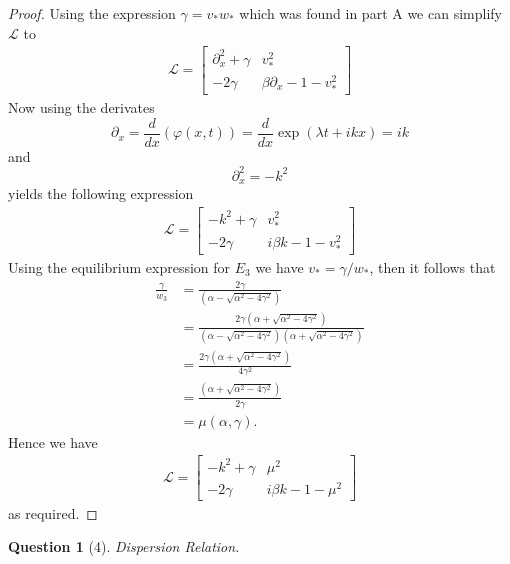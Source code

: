 \documentclass[11pt]{article}
\theoremstyle{quest}
\newtheorem*{question}{Question}
\newcommand{\Dp}{\partial}
\newcommand{\Bl}{\mathcal{L}}
\begin{document}
\begin{proof}
    Using the expression $\gamma = v_* w_*$ which was found in part A we can simplify $\Bl$
    to 
    \begin{align*}
        \Bl =
        \begin{bmatrix}
            \Dp_x^2 + \gamma & v_*^2\\
            - 2\gamma & \beta \Dp_x -1  -v_*^2
        \end{bmatrix}
    \end{align*}
    Now using the derivates $$\Dp_x = \frac{d}{dx}( \varphi(x,t) ) = \frac{d}{dx} \exp{ \left( \lambda t+ i k x  \right)  } = ik$$ 
    and $$ \Dp_x^2 = -k^2$$ 
    yields the following expression
    \begin{align*}
        \Bl =
        \begin{bmatrix}
            -k^2 + \gamma & v_*^2\\
            - 2\gamma & i\beta k  -1  -v_*^2
        \end{bmatrix}
    \end{align*}
    Using the equilibrium expression for $E_3$ we have $v_* = \gamma/ w_*$, then it follows that
    \begin{align*}
        \frac{\gamma}{w_3} &= \frac{ 2 \gamma }{(\alpha - \sqrt{ \alpha^2 - 4 \gamma^2 })} \\
                           &= \frac{2 \gamma (\alpha + \sqrt{ \alpha^2 - 4 \gamma^2 })}{(\alpha - \sqrt{ \alpha^2 - 4 \gamma^2 })(\alpha + \sqrt{ \alpha^2 - 4 \gamma^2 })} \\
                           &= \frac{ 2 \gamma (\alpha + \sqrt{ \alpha^2 - 4 \gamma^2 }) }{4\gamma^2} \\
                           &= \frac{(\alpha + \sqrt{ \alpha^2 - 4 \gamma^2 }) }{2 \gamma} \\ 
                           &= \mu(\alpha, \gamma).
    \end{align*}
    Hence we have
    \begin{align*}
        \Bl =
        \begin{bmatrix}
            -k^2 + \gamma & \mu^2\\
            - 2\gamma & i\beta k  -1  -\mu^2
        \end{bmatrix}
    \end{align*}
    as required.
\end{proof}
\clearpage
\begin{question}[4]
    Dispersion Relation. 
\end{question}
\end{document}
